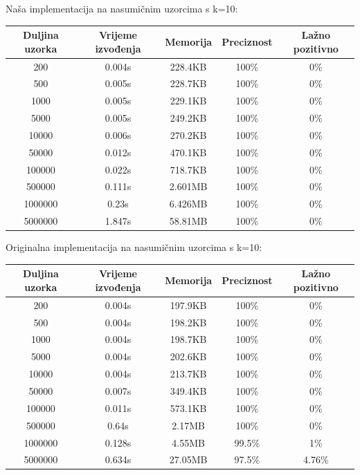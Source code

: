 \documentclass[seminarskirad]{fer}
\begin{document}
Naša implementacija na nasumičnim uzorcima s k=10:
\begin{center}
	\small
	\begin{tabular}{||c c c c c||} 
		\hline
		Duljina uzorka & Vrijeme izvođenja & Memorija & Preciznost & Lažno pozitivno \\ [0.5ex] 
		\hline\hline
		200 & 0.004s & 228.4KB & 100\% & 0\% \\ 
		\hline
		500 & 0.005s & 228.7KB & 100\% & 0\% \\
		\hline
		1000 & 0.005s & 229.1KB & 100\% & 0\% \\
		\hline
		5000 & 0.005s & 249.2KB & 100\% & 0\% \\
		\hline
		10000 & 0.006s & 270.2KB & 100\% & 0\% \\
		\hline
		50000 & 0.012s & 470.1KB & 100\% & 0\% \\ 
		\hline
		100000 & 0.022s & 718.7KB & 100\% & 0\% \\
		\hline
		500000 & 0.111s & 2.601MB & 100\% & 0\% \\
		\hline
		1000000 & 0.23s & 6.426MB & 100\% & 0\% \\
		\hline
		5000000 & 1.847s & 58.81MB & 100\% & 0\% \\ [1ex] 
		\hline
	\end{tabular}
\end{center}

Originalna implementacija na nasumičnim uzorcima s k=10:

\begin{center}
	\small
	\begin{tabular}{||c c c c c||} 
		\hline
		Duljina uzorka & Vrijeme izvođenja & Memorija & Preciznost & Lažno pozitivno \\ [0.5ex] 
		\hline\hline
		200 & 0.004s & 197.9KB & 100\% & 0\% \\ 
		\hline
		500 & 0.004s & 198.2KB & 100\% & 0\% \\
		\hline
		1000 & 0.004s & 198.7KB & 100\% & 0\% \\
		\hline
		5000 & 0.004s & 202.6KB & 100\% & 0\% \\
		\hline
		10000 & 0.004s & 213.7KB & 100\% & 0\% \\
		\hline
		50000 & 0.007s & 349.4KB & 100\% & 0\% \\ 
		\hline
		100000 & 0.011s & 573.1KB & 100\% & 0\% \\
		\hline
		500000 & 0.64s & 2.17MB & 100\% & 0\% \\
		\hline
		1000000 & 0.128s & 4.55MB & 99.5\% & 1\% \\
		\hline
		5000000 & 0.634s & 27.05MB & 97.5\% & 4.76\% \\ [1ex] 
		\hline
	\end{tabular}
\end{center}
\end{document}
